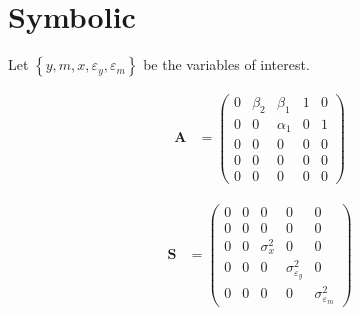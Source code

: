 \documentclass[
]{book}
\theoremstyle{definition}
\theoremstyle{definition}
\theoremstyle{definition}
\theoremstyle{remark}
\begin{document}
\hypertarget{symbolic-2}{%
\section{Symbolic}\label{symbolic-2}}

Let \(\left\{ y, m, x, \varepsilon_y, \varepsilon_m \right\}\) be the variables of interest.

\begin{align*}\mathbf{A} &=\left( \begin{array}{ccccc} 0 & \beta  _{2} & \beta  _{1} & 1 & 0 \\ 0 & 0 & \alpha  _{1} & 0 & 1 \\ 0 & 0 & 0 & 0 & 0 \\ 0 & 0 & 0 & 0 & 0 \\ 0 & 0 & 0 & 0 & 0 \end{array} \right)\end{align*}

\begin{align*}\mathbf{S} &=\left( \begin{array}{ccccc} 0 & 0 & 0 & 0 & 0 \\ 0 & 0 & 0 & 0 & 0 \\ 0 & 0 & \sigma  _{x} ^{2} & 0 & 0 \\ 0 & 0 & 0 & \sigma  _{\varepsilon  _{y}} ^{2} & 0 \\ 0 & 0 & 0 & 0 & \sigma  _{\varepsilon  _{m}} ^{2} \end{array} \right)\end{align*}
\end{document}
